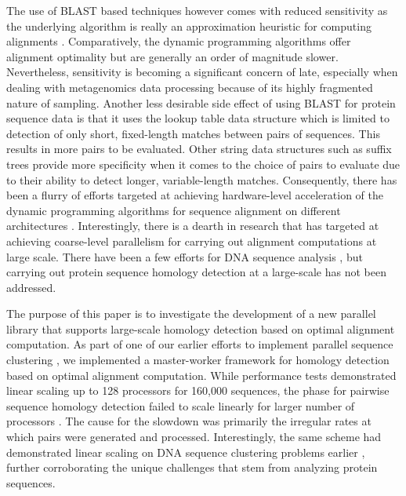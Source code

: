 \documentclass[10pt,journal,letterpaper,compsoc]{IEEEtran}
\begin{document}
The use of BLAST based techniques however comes with reduced sensitivity as the underlying algorithm is really an approximation heuristic for computing alignments \cite{Pearson91,Shpaer96}. Comparatively, the dynamic programming algorithms offer alignment optimality but are generally an order of magnitude slower. Nevertheless, sensitivity is becoming a significant concern of late, especially when dealing with metagenomics data processing because of its highly fragmented nature of sampling. Another less desirable side effect of using BLAST for protein sequence data is that it uses the lookup table data structure which is limited to detection of only short, fixed-length matches between pairs of sequences. This results in more pairs to be evaluated. Other string data structures such as suffix trees provide more specificity when it comes to the choice of pairs to evaluate due to their ability to detect longer, variable-length matches. Consequently, there has been a flurry of efforts targeted at achieving hardware-level acceleration of the dynamic programming algorithms for sequence alignment on different architectures \cite{Majumder10}. Interestingly, there is a dearth in research that has targeted at achieving coarse-level parallelism for carrying out alignment computations at large scale. There have been a few efforts for DNA sequence analysis \cite{KalyanaramanTPDS03,KalyanaramanJPDC07}, but carrying out protein sequence homology detection at a large-scale has not been addressed.



The purpose of this paper is to investigate the development of a new parallel library that supports large-scale homology detection based on optimal alignment computation. As part of one of our earlier efforts to implement parallel sequence clustering \cite{Wu08}, we implemented a master-worker framework for homology detection based on optimal alignment computation. While performance tests demonstrated linear scaling up to 128 processors for 160,000 sequences, the phase for pairwise sequence homology detection failed to scale linearly for larger number of processors \cite{Wu08}. The cause for the slowdown was primarily the irregular rates at which pairs were generated and processed. Interestingly, the same scheme had demonstrated linear scaling on DNA sequence clustering problems earlier \cite{Kalyanaraman07}, further corroborating the unique challenges that stem from analyzing protein sequences.
\end{document}
